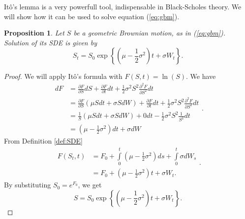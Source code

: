 \documentclass[a4paper,11pt, twoside]{book}
\newtheorem{prop}[thm]{Proposition}
\theoremstyle{definition}
\theoremstyle{remark}
\begin{document}
It\^{o}'s lemma is a very powerfull tool, indispensable in Black-Scholes theory. We will show how it can be used to solve equation (\ref{eq:gbm}).
\begin{prop}
\label{prop:solution_dynamics}
 Let $S$ be a geometric Brownian motion, as in (\ref{eq:gbm}).
 Solution of its SDE is given by
 \begin{equation}
  \label{eq:gmb_sol}
  S_t = S_0 \exp\left\{ (\mu - \frac{1}{2}\sigma^2)t + \sigma W_t \right\}.
 \end{equation}
\end{prop}
\begin{proof}
We will apply It\^{o}'s formula with $F(S,t) = \ln(S)$. We have
 \begin{equation*}
  \begin{split}
   dF &= \frac{\partial F}{\partial S}dS + \frac{\partial F}{\partial t}dt + \frac{1}{2}\sigma^2 S^2 \frac{\partial^2 F}{\partial S^2}dt \\
   &= \frac{\partial F}{\partial S}(\mu S dt + \sigma S dW) + \frac{\partial F}{\partial t}dt + \frac{1}{2}\sigma^2 S^2 \frac{\partial^2 F}{\partial S^2}dt \\    
   &= \frac{1}{S}(\mu S dt + \sigma S dW) + 0dt - \frac{1}{2}\sigma^2 S^2 \frac{1}{S^2}dt \\   
   &= (\mu - \frac{1}{2}\sigma^2) dt + \sigma dW
  \end{split}.
 \end{equation*}
 From Definition \ref{def:SDE}
 \begin{equation*}
  \begin{split}
  F(S_t,t) &= F_0 + \int\limits_0^t (\mu - \frac{1}{2}\sigma^2) ds + \int\limits_0^t \sigma dW_s\\
  &= F_0 + (\mu - \frac{1}{2}\sigma^2)t +  \sigma W_t. 
  \end{split}.
 \end{equation*}
 By substituting $S_0 = e^{F_0}$, we get
 \[ S = S_0 \exp\left\{ (\mu - \frac{1}{2}\sigma^2)t + \sigma W_t \right\}. \] 
\end{proof}
\end{document}
